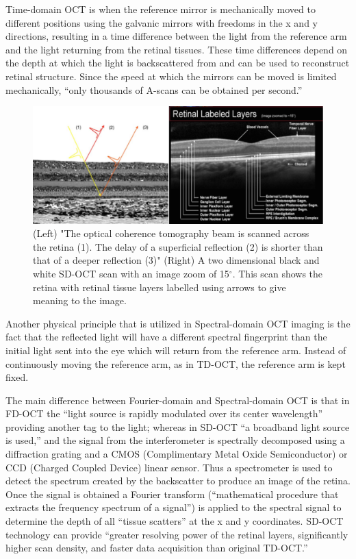 Time-domain OCT is when the reference mirror is mechanically moved to different
positions using the galvanic mirrors with freedoms in the x and y directions,
resulting in a time difference between the light from the reference arm and the
light returning from the retinal tissues.  These time differences depend on the
depth at which the light is backscattered from and can be used to reconstruct
retinal structure.  Since the speed at which the mirrors can be moved is limited
mechanically, “only thousands of A-scans can be obtained per second.” \cite{mbib_4}

\begin{figure}[htbp]
\centering
 \includegraphics{figures/morgan_4}
\caption{(Left) "The optical coherence tomography beam is scanned across the retina (1).
The delay of a superficial reflection (2) is shorter than that of a deeper reflection (3)" (Right) A two dimensional black and white SD-OCT scan with an image zoom of 15$^\circ$.\cite{mbib_6}  This scan shows the retina with retinal
tissue layers labelled using arrows to give meaning to the image.\cite{mbib_8} }
\label{fig:m_4}
\end{figure}

Another physical principle that is utilized in Spectral-domain OCT imaging is the
fact that the reflected light will have a different spectral fingerprint than the
initial light sent into the eye which will return from the reference arm.  Instead
of continuously moving the reference arm, as in TD-OCT, the reference arm is kept fixed. 

The main difference between Fourier-domain and Spectral-domain OCT is that in FD-OCT
the “light source is rapidly modulated over its center wavelength” providing another
tag to the light; whereas in SD-OCT “a broadband light source is used,” and the signal
from the interferometer is spectrally decomposed using a diffraction grating and a CMOS
(Complimentary Metal Oxide Semiconductor) or CCD (Charged Coupled Device) linear sensor.\cite{mbib_4}
Thus a spectrometer is used to detect the spectrum created by the backscatter to produce
an image of the retina.  Once the signal is obtained a Fourier transform (“mathematical
procedure that extracts the frequency spectrum of a signal”) is applied to the spectral
signal to determine the depth of all “tissue scatters” at the x and y coordinates.\cite{mbib_4,mbib_9}
SD-OCT technology can provide “greater resolving power of the retinal layers, significantly
higher scan density, and faster data acquisition than original TD-OCT.” \cite{mbib_2}

